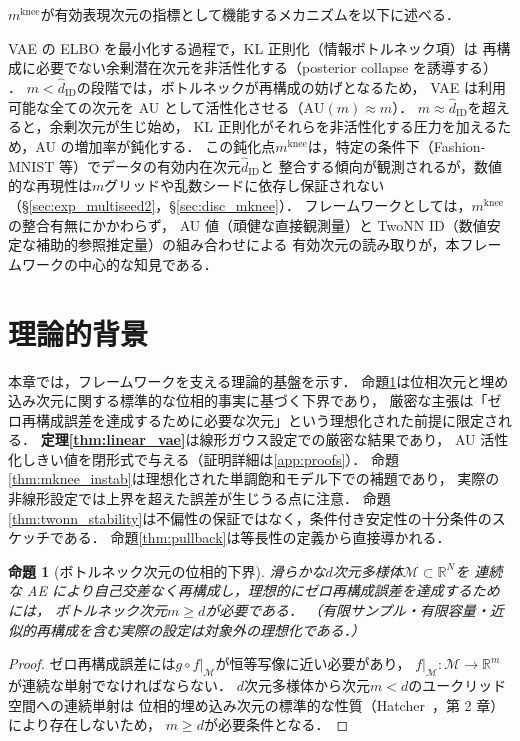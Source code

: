 \documentclass[11pt,a4paper]{jsarticle}
\newtheorem{proposition}{命題}
\newcommand{\R}{\mathbb{R}}
\newcommand{\mknee}{m^{\mathrm{knee}}}
\begin{document}
$\mknee$が有効表現次元の指標として機能するメカニズムを以下に述べる．

VAE の ELBO を最小化する過程で，KL 正則化（情報ボトルネック項）は
再構成に必要でない余剰潜在次元を非活性化する（posterior collapse を誘導する）
\cite{lucas2019elbo,higgins2017betavae}．
$m < \hat{d}_\mathrm{ID}$の段階では，ボトルネックが再構成の妨げとなるため，
VAE は利用可能な全ての次元を AU として活性化させる（$\mathrm{AU}(m) \approx m$）．
$m \approx \hat{d}_\mathrm{ID}$を超えると，余剰次元が生じ始め，
KL 正則化がそれらを非活性化する圧力を加えるため，AU の増加率が鈍化する．
この鈍化点$\mknee$は，特定の条件下（Fashion-MNIST 等）でデータの有効内在次元$\hat{d}_\mathrm{ID}$と
整合する傾向が観測されるが，数値的な再現性は$m$グリッドや乱数シードに依存し保証されない
（§\ref{sec:exp_multiseed2}，§\ref{sec:disc_mknee}）．
フレームワークとしては，$\mknee$の整合有無にかかわらず，
AU 値（頑健な直接観測量）と TwoNN ID（数値安定な補助的参照推定量）の組み合わせによる
有効次元の読み取りが，本フレームワークの中心的な知見である．

\section{理論的背景}\label{sec:theory}

本章では，フレームワークを支える理論的基盤を示す．
命題\ref{thm:lower_bound}は位相次元と埋め込み次元に関する標準的な位相的事実に基づく下界であり，
厳密な主張は「ゼロ再構成誤差を達成するために必要な次元」という理想化された前提に限定される．
\textbf{定理\ref{thm:linear_vae}}は線形ガウス設定での厳密な結果であり，
AU 活性化しきい値を閉形式で与える（証明詳細は\ref{app:proofs}）．
命題\ref{thm:mknee_instab}は理想化された単調飽和モデル下での補題であり，
実際の非線形設定では上界を超えた誤差が生じうる点に注意．
命題\ref{thm:twonn_stability}は不偏性の保証ではなく，条件付き安定性の十分条件のスケッチである．
命題\ref{thm:pullback}は等長性の定義から直接導かれる．

\begin{proposition}[ボトルネック次元の位相的下界]\label{thm:lower_bound}
滑らかな$d$次元多様体$\mathcal{M} \subset \R^N$を
連続な AE により自己交差なく再構成し，理想的にゼロ再構成誤差を達成するためには，
ボトルネック次元$m \geq d$が必要である．
（有限サンプル・有限容量・近似的再構成を含む実際の設定は対象外の理想化である．）
\end{proposition}

\begin{proof}
ゼロ再構成誤差には$g \circ f|_\mathcal{M}$が恒等写像に近い必要があり，
$f|_\mathcal{M}: \mathcal{M} \to \R^m$が連続な単射でなければならない．
$d$次元多様体から次元$m < d$のユークリッド空間への連続単射は
位相的埋め込み次元の標準的な性質（Hatcher~\cite{hatcher2002algebraic}，第 2 章）により存在しないため，
$m \geq d$が必要条件となる．
\end{proof}
\end{document}
